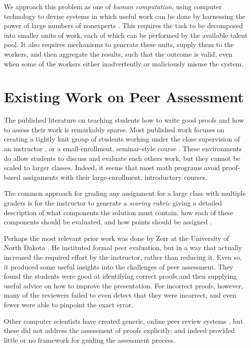 \documentclass[12pt]{article}
\begin{document}
We approach this problem as one of {\em human computation}, using
computer technology to devise systems in which useful work can be done by
harnessing the power of large numbers of nonexperts
\cite{quinn-chi11, vonahn05}.  This requires
the task to be decomposed into smaller units of work, each of which 
can be performed by the available talent pool.  It also requires
mechanisms to generate these units, supply them to the workers, and
then aggregate the results, such that the outcome is valid, even when
some of the workers either inadvertently or maliciously misuse the system.

\section{Existing Work on Peer Assessment}

The published literature on teaching students how to write good proofs
and how to assess their work is remarkably sparse.  Most published
work focuses on creating a tightly knit group of students working
under the close supervision of an instructor
\cite{cohen-amm82,jones-amm77}, or a small-enrollment, seminar-style
course \cite{reisel-amm82}.  These environments do allow students to
discuss and evaluate each others work, but they cannot be scaled to
larger classes.  Indeed, it seems that most math programs avoid
proof-based assignments with their large-enrollment, introductory
courses.

The common approach for grading any assignment for a large
class with multiple graders is for the instructor to generate a {\em
  scoring rubric} giving a detailed description of what components the
solution must contain, how each of these components should be
evaluated, and how points should be assigned
\cite{moskal-pa2000}.

Perhaps the most relevant prior work was done by Zerr at the
University of North Dakota \cite{zerr-primus11}.
He instituted formal peer evaluation, but
in a way that actually increased the required effort by the
instructor, rather than reducing it.  Even so, it produced some
useful insights into the challenges of peer assessment.  They found
the students were good at identifying correct proofs and then
supplying useful advice on how to improve the presentation.  For
incorrect proofs, however, many of the reviewers failed to even detect
that they were incorrect, and even fewer were able to pinpoint the exact error.

Other computer scientists have created generic, online peer review systems
\cite{gehringer-sigcse05, wolfe-ite04}, but these did not address the
assessment of proofs explicitly, and indeed provided little or no
framework for guiding the assessment process.
\end{document}
